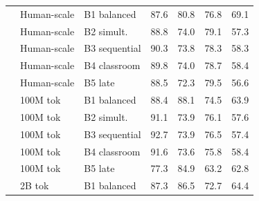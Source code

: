 \begin{table}[t]
\begin{minipage}[t]{0.49\linewidth}
\begin{tabular}{ll l cc cc}
 & Human-scale & B1 balanced & \cellcolor[rgb]{0.792,1.000,0.792} 87.6 & \cellcolor[rgb]{0.832,1.000,0.832} 80.8 & \cellcolor[rgb]{0.810,1.000,0.810} 76.8 & \cellcolor[rgb]{0.843,1.000,0.843} 69.1 \\
 & Human-scale & B2 simult. & \cellcolor[rgb]{0.785,1.000,0.785} 88.8 & \cellcolor[rgb]{0.869,1.000,0.869} 74.0 & \cellcolor[rgb]{0.793,1.000,0.793} 79.1 & \cellcolor[rgb]{0.940,1.000,0.940} 57.3 \\
 & Human-scale & B3 sequential & \cellcolor[rgb]{0.777,1.000,0.777} 90.3 & \cellcolor[rgb]{0.870,1.000,0.870} 73.8 & \cellcolor[rgb]{0.799,1.000,0.799} 78.3 & \cellcolor[rgb]{0.932,1.000,0.932} 58.3 \\
 & Human-scale & B4 classroom & \cellcolor[rgb]{0.780,1.000,0.780} 89.8 & \cellcolor[rgb]{0.869,1.000,0.869} 74.0 & \cellcolor[rgb]{0.796,1.000,0.796} 78.7 & \cellcolor[rgb]{0.931,1.000,0.931} 58.4 \\
 & Human-scale & B5 late & \cellcolor[rgb]{0.787,1.000,0.787} 88.5 & \cellcolor[rgb]{0.878,1.000,0.878} 72.3 & \cellcolor[rgb]{0.790,1.000,0.790} 79.5 & \cellcolor[rgb]{0.946,1.000,0.946} 56.6 \\
\addlinespace[1.5pt]
 & 100M tok & B1 balanced & \cellcolor[rgb]{0.788,1.000,0.788} 88.4 & \cellcolor[rgb]{0.792,1.000,0.792} 88.1 & \cellcolor[rgb]{0.826,1.000,0.826} 74.5 & \cellcolor[rgb]{0.886,1.000,0.886} 63.9 \\
 & 100M tok & B2 simult. & \cellcolor[rgb]{0.773,1.000,0.773} 91.1 & \cellcolor[rgb]{0.870,1.000,0.870} 73.9 & \cellcolor[rgb]{0.815,1.000,0.815} 76.1 & \cellcolor[rgb]{0.937,1.000,0.937} 57.6 \\
 & 100M tok & B3 sequential & \cellcolor[rgb]{0.764,1.000,0.764} 92.7 & \cellcolor[rgb]{0.870,1.000,0.870} 73.9 & \cellcolor[rgb]{0.812,1.000,0.812} 76.5 & \cellcolor[rgb]{0.939,1.000,0.939} 57.4 \\
 & 100M tok & B4 classroom & \cellcolor[rgb]{0.770,1.000,0.770} 91.6 & \cellcolor[rgb]{0.871,1.000,0.871} 73.6 & \cellcolor[rgb]{0.817,1.000,0.817} 75.8 & \cellcolor[rgb]{0.931,1.000,0.931} 58.4 \\
 & 100M tok & B5 late & \cellcolor[rgb]{0.849,1.000,0.849} 77.3 & \cellcolor[rgb]{0.810,1.000,0.810} 84.9 & \cellcolor[rgb]{0.906,1.000,0.906} 63.2 & \cellcolor[rgb]{0.895,1.000,0.895} 62.8 \\
\addlinespace[1.5pt]
 & 2B tok & B1 balanced & \cellcolor[rgb]{0.794,1.000,0.794} 87.3 & \cellcolor[rgb]{0.801,1.000,0.801} 86.5 & \cellcolor[rgb]{0.839,1.000,0.839} 72.7 & \cellcolor[rgb]{0.881,1.000,0.881} 64.4 \\

\end{tabular}
\end{minipage}
\end{table}

